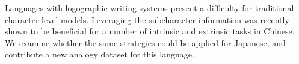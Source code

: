 Languages with logographic writing systems present a difficulty for traditional character-level models. Leveraging the subcharacter information was recently shown to be beneficial for a number of intrinsic and extrinsic tasks in Chinese. We examine whether the same strategies could be applied for Japanese, and contribute a new analogy dataset for this language.
